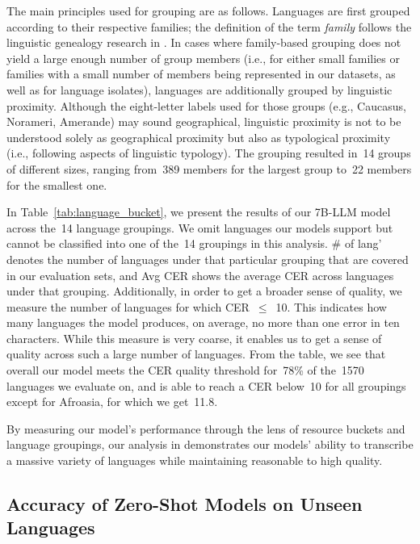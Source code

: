 \documentclass[]{fairmeta}
\begin{document}
The main principles used for grouping are as follows. Languages are first grouped according to their respective families; the definition of the term \textit{family} follows the linguistic genealogy research in \citet{hammerstrom2024glottolog}. In cases where family-based grouping does not yield a large enough number of group members (i.e., for either small families or families with a small number of members being represented in our datasets, as well as for language isolates), languages are additionally grouped by linguistic proximity. Although the eight-letter labels used for those groups (e.g., Caucasus, Norameri, Amerande) may sound geographical, linguistic proximity is not to be understood solely as geographical proximity but also as typological proximity (i.e., following aspects of linguistic typology). The grouping resulted in~14 groups of different sizes, ranging from~389 members for the largest group to~22 members for the smallest one.

In Table~\ref{tab:language_bucket}, we present the results of our 7B-LLM model across the~14 language groupings.  We omit languages our models support but cannot be classified into one of the~14 groupings in this analysis. \# of lang' denotes the number of languages under that particular grouping that are covered in our evaluation sets, and Avg CER shows the average CER across languages under that grouping. Additionally, in order to get a broader sense of quality, we measure the number of languages for which CER~$\leq$~10.  This indicates how many languages the model produces, on average, no more than one error in ten characters.  While this measure is very coarse, it enables us to get a sense of quality across such a large number of languages.  From the table, we see that overall our model meets the CER quality threshold for~78\% of the~1570 languages we evaluate on, and is able to reach a CER below~10 for all groupings except for Afroasia, for which we get~11.8.

By measuring our model's performance through the lens of resource buckets and language groupings, our analysis in  demonstrates our models' ability to transcribe a massive variety of languages while maintaining reasonable to high quality.

\subsection{Accuracy of Zero-Shot Models on Unseen Languages}
\label{sec:zs_asr_results}
\end{document}
